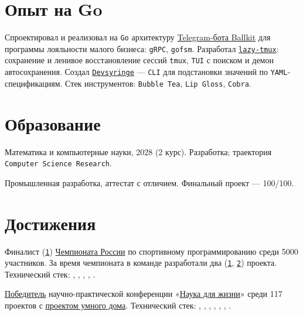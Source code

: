 \documentclass[margin,line]{resume}
\begin{document}
\begin{resume}
  \section{\mysidestyle Опыт на Go}
  Спроектировал и реализовал на \texttt{Go} архитектуру
  \href{https://github.com/ballkit/ballkit-platform}{Telegram-бота Ballkit}
  для программы лояльности малого бизнеса: \texttt{gRPC}, \texttt{gofsm}.
  Разработал \href{https://github.com/alchemmist/lazy-tmux}{\texttt{lazy-tmux}}:
  сохранение и ленивое восстановление сессий \texttt{tmux},
  \texttt{TUI} с поиском и демон автосохранения.
  Создал \href{https://github.com/alchemmist/devsyringe}{\texttt{Devsyringe}} ---
  \texttt{CLI} для подстановки значений по \texttt{YAML}-спецификациям.
  Стек инструментов: \texttt{Bubble Tea}, \texttt{Lip Gloss}, \texttt{Cobra}.

  {\let\makelabel\descriptionlabel
    \renewcommand*\descriptionlabel[1]{\hspace\labelsep\normalfont #1}
    \section{\mysidestyle Образование}\vspace{0.7mm}
    \begin{description}[leftmargin=0pt, itemindent=*, itemsep=3pt]
      \item[\href{https://cu.ru}{Центральный университет}.]
        Математика и компьютерные науки, 2028 (2 курс).
        Разработка; траектория \texttt{Computer Science Research}.
      \item[\href{https://lyceum.yandex.ru/}{Лицей Академии Яндекса}.]
        Промышленная разработка, аттестат с отличием.
        Финальный проект --- 100/100.
    \end{description}}

  \section{\mysidestyle Достижения}
  Финалист
  (\href{https://alchemmist.github.io/CV/attachments/russian-chemp-final.pdf}{\texttt{1}})
  \href{https://fsp-russia.ru/}{Чемпионата
  России} по спортивному
  программированию среди 5000 участников. За время чемпионата в
  команде разработали два
  (\href{https://github.com/alchemmist/sport-afisha/}{\texttt{1}},
  \href{https://github.com/alchemmist/sportprog}{\texttt{2}})
  проекта. Технический стек:
  , ,
  ,
  ,
  .

  \href{https://alchemmist.github.io/CV/attachments/scince-for-life-win.pdf}{Победитель}
  научно-практической конференции
  «\href{https://conf.profil.mos.ru/academ}{Наука для
  жизни}» среди 117 проектов с
  \href{https://github.com/smart-cab/}{проектом умного
  дома}. Технический стек: ,
  , , ,
  , , .

\end{resume}

\clearpage
\end{document}
